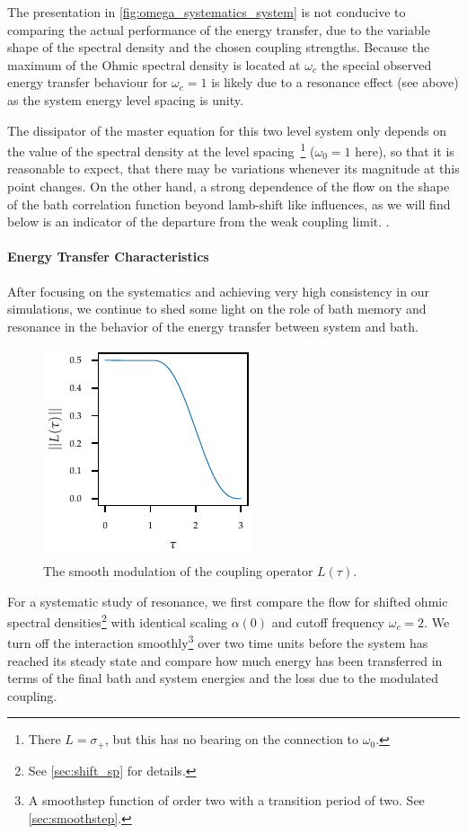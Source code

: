 The presentation in \cref{fig:omega_systematics_system} is not
conducive to comparing the actual performance of the energy transfer,
due to the variable shape of the spectral density and the chosen
coupling strengths. Because the maximum of the Ohmic spectral density
is located at \(ω_c\) the special observed energy transfer behaviour
for \(ω_c=1\) is likely due to a resonance effect (see above) as the
system energy level spacing is unity.

The dissipator of the master equation for this two level system only
depends on the value of the spectral density at the level
spacing~\cite[p. 66]{Rivas2012}\footnote{There \(L=σ_{+}\), but this
  has no bearing on the connection to \(ω_{0}\).}  (\(ω_{0}=1\) here),
so that it is reasonable to expect, that there may be variations
whenever its magnitude at this point changes.  On the other hand, a
strong dependence of the flow on the shape of the bath correlation
function beyond lamb-shift like influences, as we will find below is
an indicator of the departure from the weak coupling limit.
.

\paragraph{Energy Transfer Characteristics}
After focusing on the systematics and achieving very high consistency
in our simulations, we continue to shed some light on the role of bath
memory and resonance in the behavior of the energy transfer between
system and bath.

\begin{figure}
  \centering
  \includegraphics{figs/one_bath_syst/L_mod}
  \caption{\label{fig:L_mod} The smooth modulation of the coupling
    operator \(L(τ)\).}
\end{figure}
For a systematic study of resonance, we first compare the flow for
shifted ohmic spectral densities\footnote{See \cref{sec:shift_sp} for
  details.} with identical scaling \(α(0)\) and cutoff frequency
\(ω_c=2\). We turn off the interaction smoothly\footnote{A smoothstep
  function of order two with a transition period of two. See
  \cref{sec:smoothstep}.} over two time units before the system has
reached its steady state and compare how much energy has been
transferred in terms of the final bath and system energies and the
loss due to the modulated coupling.

